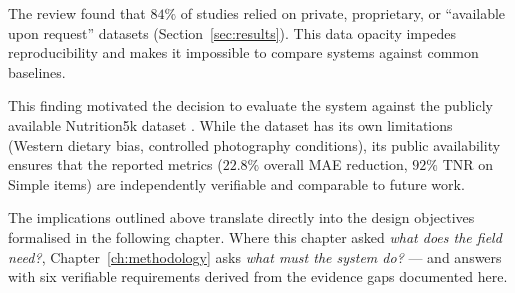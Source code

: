 The review found that $84\%$ of studies relied on private, proprietary, or ``available upon request'' datasets (Section~\ref{sec:results}). This data opacity impedes reproducibility and makes it impossible to compare systems against common baselines.

This finding motivated the decision to evaluate the system against the publicly available Nutrition5k dataset \citep{thamesNutrition5kAutomaticNutritional2021}. While the dataset has its own limitations (Western dietary bias, controlled photography conditions), its public availability ensures that the reported metrics ($22.8\%$ overall MAE reduction, $92\%$ TNR on Simple items) are independently verifiable and comparable to future work.

The implications outlined above translate directly into the design objectives formalised in the following chapter. Where this chapter asked \emph{what does the field need?}, Chapter~\ref{ch:methodology} asks \emph{what must the system do?} --- and answers with six verifiable requirements derived from the evidence gaps documented here.
